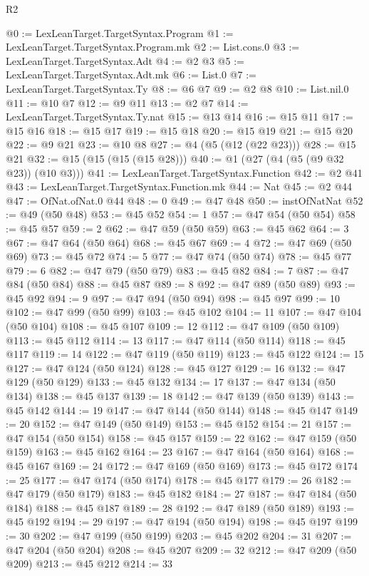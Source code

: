 \begin{lexlean}{R2}
\begin{coremodule}
@0 := LexLeanTarget.TargetSyntax.Program
@1 := LexLeanTarget.TargetSyntax.Program.mk
@2 := List.cons.{0}
@3 := LexLeanTarget.TargetSyntax.Adt
@4 := @2 @3
@5 := LexLeanTarget.TargetSyntax.Adt.mk
@6 := List.{0}
@7 := LexLeanTarget.TargetSyntax.Ty
@8 := @6 @7
@9 := @2 @8
@10 := List.nil.{0}
@11 := @10 @7
@12 := @9 @11
@13 := @2 @7
@14 := LexLeanTarget.TargetSyntax.Ty.nat
@15 := @13 @14
@16 := @15 @11
@17 := @15 @16
@18 := @15 @17
@19 := @15 @18
@20 := @15 @19
@21 := @15 @20
@22 := @9 @21
@23 := @10 @8
@27 := @4 (@5 (@12 (@22 @23)))
@28 := @15 @21
@32 := @15 (@15 (@15 (@15 @28)))
@40 := @1 (@27 (@4 (@5 (@9 @32 @23)) (@10 @3)))
@41 := LexLeanTarget.TargetSyntax.Function
@42 := @2 @41
@43 := LexLeanTarget.TargetSyntax.Function.mk
@44 := Nat
@45 := @2 @44
@47 := OfNat.ofNat.{0} @44
@48 := 0
@49 := @47 @48
@50 := instOfNatNat
@52 := @49 (@50 @48)
@53 := @45 @52
@54 := 1
@57 := @47 @54 (@50 @54)
@58 := @45 @57
@59 := 2
@62 := @47 @59 (@50 @59)
@63 := @45 @62
@64 := 3
@67 := @47 @64 (@50 @64)
@68 := @45 @67
@69 := 4
@72 := @47 @69 (@50 @69)
@73 := @45 @72
@74 := 5
@77 := @47 @74 (@50 @74)
@78 := @45 @77
@79 := 6
@82 := @47 @79 (@50 @79)
@83 := @45 @82
@84 := 7
@87 := @47 @84 (@50 @84)
@88 := @45 @87
@89 := 8
@92 := @47 @89 (@50 @89)
@93 := @45 @92
@94 := 9
@97 := @47 @94 (@50 @94)
@98 := @45 @97
@99 := 10
@102 := @47 @99 (@50 @99)
@103 := @45 @102
@104 := 11
@107 := @47 @104 (@50 @104)
@108 := @45 @107
@109 := 12
@112 := @47 @109 (@50 @109)
@113 := @45 @112
@114 := 13
@117 := @47 @114 (@50 @114)
@118 := @45 @117
@119 := 14
@122 := @47 @119 (@50 @119)
@123 := @45 @122
@124 := 15
@127 := @47 @124 (@50 @124)
@128 := @45 @127
@129 := 16
@132 := @47 @129 (@50 @129)
@133 := @45 @132
@134 := 17
@137 := @47 @134 (@50 @134)
@138 := @45 @137
@139 := 18
@142 := @47 @139 (@50 @139)
@143 := @45 @142
@144 := 19
@147 := @47 @144 (@50 @144)
@148 := @45 @147
@149 := 20
@152 := @47 @149 (@50 @149)
@153 := @45 @152
@154 := 21
@157 := @47 @154 (@50 @154)
@158 := @45 @157
@159 := 22
@162 := @47 @159 (@50 @159)
@163 := @45 @162
@164 := 23
@167 := @47 @164 (@50 @164)
@168 := @45 @167
@169 := 24
@172 := @47 @169 (@50 @169)
@173 := @45 @172
@174 := 25
@177 := @47 @174 (@50 @174)
@178 := @45 @177
@179 := 26
@182 := @47 @179 (@50 @179)
@183 := @45 @182
@184 := 27
@187 := @47 @184 (@50 @184)
@188 := @45 @187
@189 := 28
@192 := @47 @189 (@50 @189)
@193 := @45 @192
@194 := 29
@197 := @47 @194 (@50 @194)
@198 := @45 @197
@199 := 30
@202 := @47 @199 (@50 @199)
@203 := @45 @202
@204 := 31
@207 := @47 @204 (@50 @204)
@208 := @45 @207
@209 := 32
@212 := @47 @209 (@50 @209)
@213 := @45 @212
@214 := 33

\end{coremodule}
\end{lexlean}
